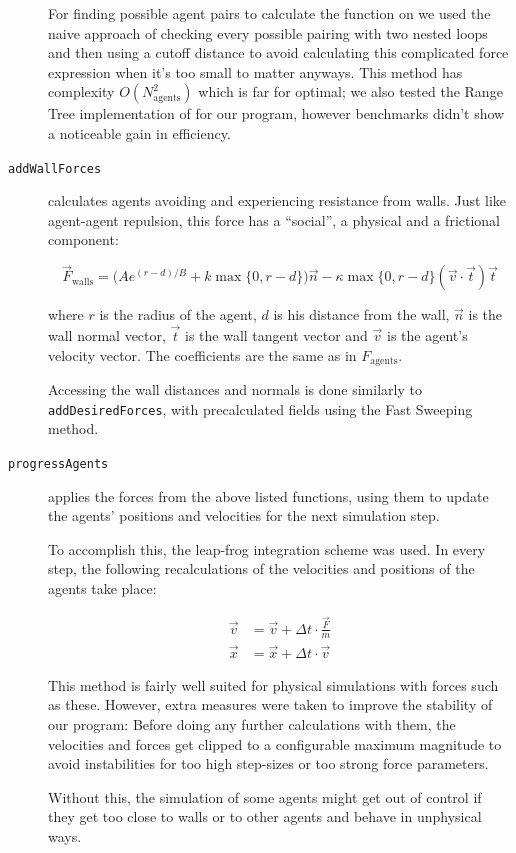 \documentclass[11pt]{article}
\begin{document}
\begin{description}
For finding possible agent pairs to calculate the function on we used the naive
approach of checking every possible pairing with two nested loops and then
using a cutoff distance to avoid calculating this complicated force expression
when it's too small to matter anyways.  This method has complexity
$O(N_\text{agents}^2)$ which is far for optimal; we also tested the Range Tree
implementation of \cite{multilevel} for our program, however benchmarks didn't
show a noticeable gain in efficiency.

\item[\texttt{addWallForces}] calculates agents avoiding and experiencing
resistance from walls.  Just like agent-agent repulsion, this force has a
``social'', a physical and a frictional component:

\[ \vec{F}_\text{walls} = \big(A e^{(r-d)/B} + k \max\{0, r-d\}\big) \vec{n} -
                    \kappa \max\{0, r-d\} (\vec{v} \cdot \vec{t}) \vec{t} \]

where $r$ is the radius of the agent, $d$ is his distance from the wall,
$\vec{n}$ is the wall normal vector, $\vec{t}$ is the wall tangent vector and
$\vec{v}$ is the agent's velocity vector.  The coefficients are the same as in
$F_\text{agents}$.

Accessing the wall distances and normals is done similarly to
\texttt{addDesiredForces}, with precalculated fields using the Fast Sweeping
method.

\item[\texttt{progressAgents}] applies the forces from the above listed
functions, using them to update the agents' positions and velocities for the
next simulation step.

To accomplish this, the leap-frog integration scheme was used.  In every step,
the following recalculations of the velocities and positions of the agents take
place:

\begin{align*}
\vec{v} &= \vec{v} + \Delta t \cdot \frac{\vec{F}}{m}  \\
\vec{x} &= \vec{x} + \Delta t \cdot \vec{v}
\end{align*}

This method is fairly well suited for physical simulations with forces such as
these.  However, extra measures were taken to improve the stability of our
program:  Before doing any further calculations with them, the velocities and
forces get clipped to a configurable maximum magnitude to avoid instabilities
for too high step-sizes or too strong force parameters.

Without this, the simulation of some agents might get out of control if they
get too close to walls or to other agents and behave in unphysical ways.

\end{description}
\end{document}
